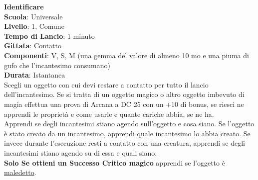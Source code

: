 \begin{multicols}{2}
\medskip\textbf{Identificare}\hypertarget{incantesimoidentificare}{}\\
\textbf{Scuola}: Universale\\
\textbf{Livello}: 1, Comune\\
\textbf{Tempo di Lancio}: 1 minuto\\
\textbf{Gittata}: Contatto\\
\textbf{Componenti}: V, S, M (una gemma del valore di almeno 10 mo e una piuma di gufo che l'incantesimo consumano)\\
\textbf{Durata}: Istantanea\\
Scegli un oggetto con cui devi restare a contatto per tutto il lancio dell'incantesimo. Se si tratta di un oggetto magico o altro oggetto imbevuto di magia effettua una prova di Arcana a DC 25 con un +10 di bonus, se riesci ne apprendi le proprietà e come usarle e quante cariche abbia, se ne ha. \\
Apprendi se degli incantesimi stiano agendo sull'oggetto e cosa siano. Se l'oggetto è stato creato da un incantesimo, apprendi quale incantesimo lo abbia creato. Se invece durante l'esecuzione resti a contatto con una creatura, apprendi se degli incantesimi stiano agendo su di essa e quali siano.\\
\textbf{Solo Se ottieni un Successo Critico magico} apprendi se l'oggetto è \hyperlink{oggettimaledettiid}{maledetto}.


\end{multicols}
